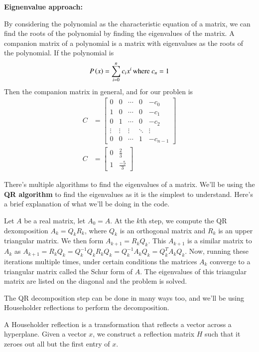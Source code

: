 \documentclass[journal]{IEEEtran}
\begin{document}
\textbf{Eignenvalue approach:}

By considering the polynomial as the characteristic equation of a matrix, we can find the roots of the polynomial by finding the eigenvalues of the matrix. A companion matrix of a polynomial is a matrix with eigenvalues as the roots of the polynomial. If the polynomial is 
\begin{align}
  P\left(x\right)=\sum\limits_{i=0}^n c_ix^{i}\,\text{where }c_n = 1
\end{align}
Then the companion matrix in general, and for our problen is 
\begin{align}
  C &= \begin{bmatrix}
    0&0&\cdots&0&-c_0\\
    1&0&\cdots&0&-c_1\\
    0&1&\cdots&0&-c_2\\
    \vdots&\vdots&\vdots&\ddots&\vdots\\
    0&0&\cdots&1&-c_{n-1}
  \end{bmatrix}\\
  C &= \begin{bmatrix}
    0&\frac{2}{3}\\
    1&\frac{-5}{3}
  \end{bmatrix}
\end{align}

There's multiple algorithms to find the eigenvalues of a matrix. We'll be using the \textbf{QR algorithm} to find the eigenvalues as it is the simplest to understand. Here's a brief explanation of what we'll be doing in the code. 

Let $A$ be a real matrix, let $A_0 = A$. At the $k$th step, we compute the QR dexomposition $A_k = Q_kR_k$, where $Q_k$ is an orthogonal matrix and $R_k$ is an upper triangular matrix. We then form $A_{k+1} = R_kQ_k$. This $A_{k+1}$ is a similar matrix to $A_k$  as $A_{k+1} = R_kQ_k = Q^{-1}_kQ_kR_kQ_k = Q^{-1}_kA_kQ_k = Q^T_kA_kQ_k$. Now, running these iterations multiple times, under certain conditions the matrices $A_k$ converge to a triangular matrix called the Schur form of $A$. The eigenvalues of this triangular matrix are listed on the diagonal and the problem is solved. 

The QR decomposition step can be done in many ways too, and we'll be using Householder reflections to perform the decomposition. 

A Householder reflection is a transformation that reflects a vector across a hyperplane. Given a vector $x$, we construct a reflection matrix $H$ such that it zeroes out all but the first entry of $x$. 
\end{document}
